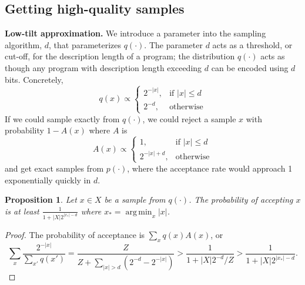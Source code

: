 \documentclass{article}
\DeclareMathOperator*{\argmin}{arg\,min} %
\DeclareMathOperator{\argmin}{argmin} %
\newtheorem{proposition}{Proposition}
\begin{document}
\subsection{Getting high-quality samples}
\textbf{Low-tilt approximation.}
We introduce a parameter into the sampling algorithm, $d$, that parameterizes $q(\cdot )$.
The parameter $d$ acts as a threshold, or cut-off, for the description length of a program;
the distribution $q(\cdot )$ acts as though any program with description length exceeding $d$ can be encoded using $d$ bits. Concretely,
\begin{equation}
  q(x) \propto \begin{cases}
    2^{-\lvert x \rvert },& \text{if } \lvert x \rvert \leq d\\
    2^{-d},              & \text{otherwise}
\end{cases}
  \end{equation}
If we could sample exactly from $q(\cdot )$, we could reject a sample $x$ with probability $1-A(x)$ where $A$ is
\begin{equation}
  A(x) \propto \begin{cases}
    1,& \text{if } \lvert x \rvert \leq d\\
    2^{-\lvert x \rvert +d},              & \text{otherwise}
    \end{cases}
  \end{equation}
and get exact samples from $p(\cdot )$, where the acceptance rate would approach 1 exponentially quickly in $d$.
\begin{proposition}\label{acceptanceBound}
  Let $x\in X$ be a sample from $q(\cdot )$. The probability of accepting $x$ is at least $\frac{1}{1 + |X|2^{\lvert x_* \rvert -d}}$ where $x_* = \argmin_x \lvert x \rvert $.
\end{proposition}
\begin{proof}
  The probability of acceptance is $\sum_x q(x) A(x)$, or
  \begin{equation}
     \sum_x \frac{2^{-\lvert x \rvert }}{\sum_{x'}q(x')} = \frac{Z}{Z + \sum_{\lvert x \rvert  > d}(2^{-d} - 2^{-\lvert x \rvert }) } > \frac{1}{1 + |X|2^{-d}/Z}>\frac{1}{1 + |X|2^{\lvert x_* \rvert -d}}.
    \end{equation}
\end{proof}
\end{document}
